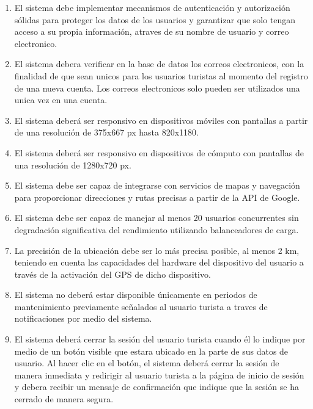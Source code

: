 \documentclass{article}
\begin{document}
\begin{enumerate}
    \item El sistema debe implementar mecanismos de autenticación y autorización sólidas para proteger los datos de los usuarios y garantizar que solo tengan acceso a su propia información, atraves de su nombre de usuario y correo electronico.

    \item El sistema debera verificar en la base de datos los correos electronicos, con la finalidad de que sean unicos para los usuarios turistas al momento del registro de una nueva cuenta. Los correos electronicos solo pueden ser utilizados una unica vez en una cuenta.

    \item El sistema deberá ser responsivo en dispositivos móviles con pantallas a partir de una resolución de 375x667 px hasta 820x1180.
    
    \item El sistema deberá ser responsivo en dispositivos de cómputo con pantallas de una resolución de 1280x720 px.
    
    \item El sistema debe ser capaz de integrarse con servicios de mapas y navegación para proporcionar direcciones y rutas precisas a partir de la API de Google.
    
    \item El sistema debe ser capaz de manejar al menos 20 usuarios concurrentes sin degradación significativa del rendimiento utilizando balanceadores de carga.
    
    \item La precisión de la ubicación debe ser lo más precisa posible, al menos 2 km, teniendo en cuenta las capacidades del hardware del dispositivo del usuario a través de la activación del GPS de dicho dispositivo.
    
    \item El sistema no deberá estar disponible únicamente en periodos de mantenimiento previamente señalados al usuario turista a traves de notificaciones por medio del sistema.
    
    \item El sistema deberá cerrar la sesión del usuario turista cuando él lo indique por medio de un botón visible que estara ubicado en la parte de sus datos de usuario. Al hacer clic en el botón, el sistema deberá cerrar la sesión de manera inmediata y redirigir al usuario turista a la página de inicio de sesión y debera recibir un mensaje de confirmación que indique que la sesión se ha cerrado de manera segura. 
    

\end{enumerate}
\end{document}
